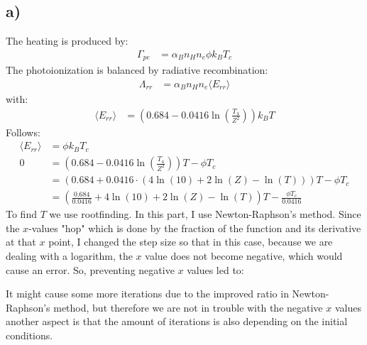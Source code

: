 \subsection*{a)}
The heating is produced by:
\begin{align}
    \Gamma_{pe} &= \alpha_B n_H n_e \phi k_B T_c
\end{align}
The photoionization is balanced by radiative recombination:
\begin{align}
    \Lambda_{rr} &= \alpha_B n_H n_e \langle E_{rr} \rangle
\end{align}
with:
\begin{align}
    \langle E_{rr} \rangle &= \left(0.684-0.0416 \ln \left(\frac{T_4}{Z^2}\right)\right) k_B T
\end{align}
Follows: 
\begin{align}
    \langle E_{rr} \rangle &= \phi k_B T_c \\
    0 &= \left(0.684-0.0416 \ln \left(\frac{T_4}{Z^2}\right)\right)  T -\phi  T_c \\
    &= \left(0.684 + 0.0416 \cdot (4 \ln \left(10\right) + 2 \ln \left(Z\right) -  \ln \left(T\right))\right)  T -\phi  T_c\\
    &= \left(\frac{0.684}{0.0416}+ 4 \ln \left(10\right) + 2 \ln \left(Z\right) -  \ln \left(T\right)\right)T - \frac{\phi  T_c}{0.0416}
\end{align}
To find \( T \) we use rootfinding. In this part, I use Newton-Raphson's method. Since the \( x \)-values "hop" which is done by the fraction of the function and its derivative at that \( x \) point, I changed the step size so that in this case, because we are dealing with a logarithm, the \( x \) value does not become negative, which would cause an error. So, preventing negative \( x \) values led to: 
 
It might cause some more iterations due to the improved ratio in Newton-Raphson's method, but therefore we are not in trouble with the negative \( x \) values another aspect is that the amount of iterations is also depending on the initial conditions.  

